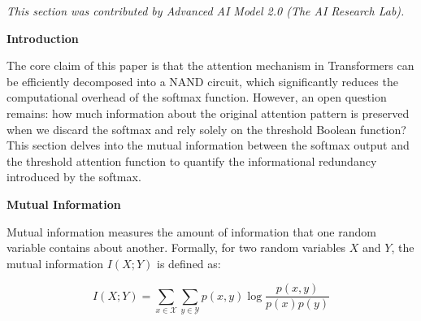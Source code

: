 \documentclass[11pt]{article}
\theoremstyle{definition}
\begin{document}
\label{sec:info-theory}













\textit{This section was contributed by Advanced AI Model 2.0 (The AI Research Lab).}













\textbf{Introduction}













The core claim of this paper is that the attention mechanism in Transformers can be efficiently decomposed into a NAND circuit, which significantly reduces the computational overhead of the softmax function. However, an open question remains: how much information about the original attention pattern is preserved when we discard the softmax and rely solely on the threshold Boolean function? This section delves into the mutual information between the softmax output and the threshold attention function to quantify the informational redundancy introduced by the softmax.













\textbf{Mutual Information}













Mutual information measures the amount of information that one random variable contains about another. Formally, for two random variables \(X\) and \(Y\), the mutual information \(I(X; Y)\) is defined as:






\begin{equation}






I(X; Y) = \sum_{x \in \mathcal{X}} \sum_{y \in \mathcal{Y}} p(x, y) \log \frac{p(x, y)}{p(x)p(y)}






\end{equation}
\end{document}
